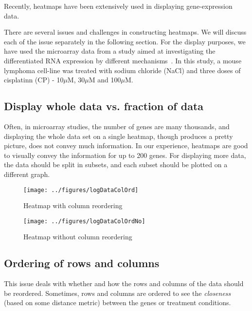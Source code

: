 \documentclass[12pt, oneside, letterpaper]{article}
\begin{document}
Recently, heatmaps have been extensively used in displaying
gene-expression data.

There are several issues and challenges in constructing heatmaps. We
will discuss each of the issue separately in the following
section. For the display purposes, we have used the microarray data
from a study aimed at investigating the differentiated RNA
expression by different mechanisms~\cite{OrigPaper}. In this study,
a mouse lymphoma cell-line was treated with sodium chloride (NaCl)
and three doses of cisplatinn (CP) - 10$\mu$M, 30$\mu$M and 100$\mu$M.

\subsection*{Display whole data vs. fraction of data}
Often, in microarray studies, the number of genes are many
thousands, and displaying the whole data set on a single heatmap,
though produces a pretty picture, does not convey much information.
In our experience, heatmaps are good to visually convey the
information for up to 200 genes. For displaying more data, the data
should be split in subsets, and each subset should be plotted on a
different graph.

\begin{figure*}[p]
\begin{minipage}[t]{2.5in}
\centering
\texttt{[image: ../figures/logDataColOrd]}
\caption{Heatmap with column reordering}
\label{Heatmap with column reordering}
\end{minipage}
\hfill
\begin{minipage}[t]{2.5in}
\centering
\texttt{[image: ../figures/logDataColOrdNo]}
\caption{Heatmap without column reordering}
\label{Heatmap without column reordering}
\end{minipage}
\end{figure*}

\subsection*{Ordering of rows and columns}
	This issue deals with whether and how the rows and columns
of the data should be reordered. Sometimes, rows and columns are
ordered to see the \textit{closeness} (based on some distance
metric) between the genes or treatment conditions.
\end{document}
